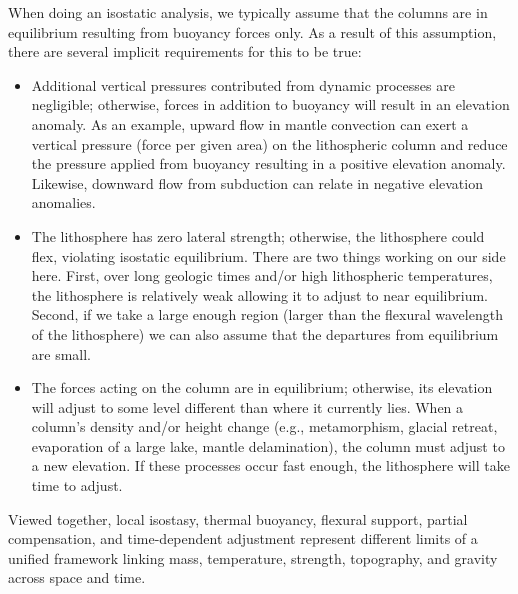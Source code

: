 When doing an isostatic analysis, we typically assume that the columns are in equilibrium resulting from buoyancy forces only.  As a result of this assumption, there are several implicit requirements for this to be true:
\begin{itemize}
    \item Additional vertical pressures contributed from dynamic processes are negligible; otherwise, forces in addition to buoyancy will result in an elevation anomaly.  As an example, upward flow in mantle convection can exert a vertical pressure (force per given area) on the lithospheric column and reduce the pressure applied from buoyancy resulting in a positive elevation anomaly.  Likewise, downward flow from subduction can relate in negative elevation anomalies.

    \item The lithosphere has zero lateral strength; otherwise, the lithosphere could flex, violating isostatic equilibrium.  There are two things working on our side here.  First, over long geologic times and/or high lithospheric temperatures, the lithosphere is relatively weak allowing it to adjust to near equilibrium.  Second, if we take a large enough region (larger than the flexural wavelength of the lithosphere) we can also assume that the departures from equilibrium are small.

    \item The forces acting on the column are in equilibrium; otherwise, its elevation will adjust to some level different than where it currently lies.  When a column's density and/or height change (e.g., metamorphism, glacial retreat, evaporation of a large lake, mantle delamination), the column must adjust to a new elevation.  If these processes occur fast enough, the lithosphere will take time to adjust.
\end{itemize}

Viewed together, local isostasy, thermal buoyancy, flexural support, partial compensation, and time-dependent adjustment represent different limits of a unified framework linking mass, temperature, strength, topography, and gravity across space and time.


\nocite{Watts2001}


